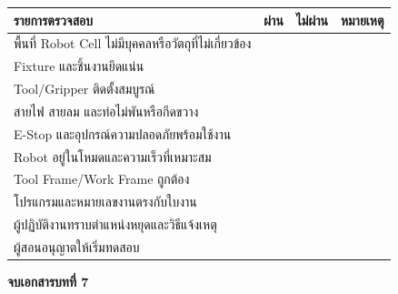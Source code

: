 \begin{table}[htbp]
    \centering
    \begin{tabular}{l c c l}
        \hline
        \textbf{รายการตรวจสอบ} & \textbf{ผ่าน} & \textbf{ไม่ผ่าน} & \textbf{หมายเหตุ} \\
        \hline
        พื้นที่ Robot Cell ไม่มีบุคคลหรือวัตถุที่ไม่เกี่ยวข้อง &  &  &  \\
        Fixture และชิ้นงานยึดแน่น &  &  &  \\
        Tool/Gripper ติดตั้งสมบูรณ์ &  &  &  \\
        สายไฟ สายลม และท่อไม่พันหรือกีดขวาง &  &  &  \\
        E-Stop และอุปกรณ์ความปลอดภัยพร้อมใช้งาน &  &  &  \\
        Robot อยู่ในโหมดและความเร็วที่เหมาะสม &  &  &  \\
        Tool Frame/Work Frame ถูกต้อง &  &  &  \\
        โปรแกรมและหมายเลขงานตรงกับใบงาน &  &  &  \\
        ผู้ปฏิบัติงานทราบตำแหน่งหยุดและวิธีแจ้งเหตุ &  &  &  \\
        ผู้สอนอนุญาตให้เริ่มทดสอบ &  &  &  \\
        \hline
    \end{tabular}
\end{table}



\textbf{จบเอกสารบทที่ 7}
